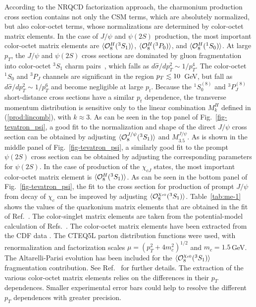According to the NRQCD factorization approach, the charmonium
production cross section contains not only the CSM terms, which are
absolutely normalized, but also color-octet terms, whose
normalizations are determined by color-octet matrix elements.  In the
case of $J/\psi$ and $\psi(2S)$ production, the most important
color-octet matrix elements are $\langle{\cal O}^H_8({}^3S_1)\rangle$,
$\langle{\cal O}^H_8({}^3P_0)\rangle$, and $\langle{\cal
O}^H_8({}^1S_0)\rangle$. At large $p_T$, the $J/\psi$ and $\psi(2S)$
cross sections are dominated by gluon fragmentation into color-octet
${}^3S_1$ charm pairs~\cite{Braaten:1995vv}, which falls as
$d\hat{\sigma}/dp_T^2\sim1/p_T^4$. The color-octet ${}^1S_0$ and
${}^3P_J$ channels are significant in the region $p_T\; \rlap{\lower
3.5 pt \hbox{$\mathchar \sim$}} \raise 1pt \hbox {$<$}\; 10$~GeV, but
fall as $d\hat{\sigma}/dp_T^2\sim1/p_T^6$ and become negligible at
large $p_t$.  Because the ${}^1S_0^{(8)}$ and ${}^3P_J^{(8)}$
short-distance cross sections have a similar $p_t$ dependence, the
transverse momentum distribution is sensitive only to the linear
combination $M^H_k$ defined in (\ref{prod:lincomb}), with $k\approx
3$.  As can be seen in the top panel of Fig.~\ref{fig-tevatron_psi}, a
good fit to the normalization and shape of the direct $J/\psi$ cross
section can be obtained by adjusting $\langle{\cal
O}^{J/\psi}_8({}^3S_1)\rangle$ and $M^{J/\psi}_{3.5}$. As is shown in
the middle panel of Fig.~\ref{fig-tevatron_psi}, a similarly good fit
to the prompt $\psi(2S)$ cross section can be obtained by adjusting
the corresponding parameters for $\psi(2S)$.  In the case of
production of the $\chi_{cJ}$ states, the most important color-octet
matrix element is $\langle{\cal O}^H_8({}^3S_1)\rangle$.  As can be
seen in the bottom panel of Fig.~\ref{fig-tevatron_psi}, the fit to
the cross section for production of prompt $J/\psi$ from decay of
$\chi_c$ can be improved by adjusting $\langle{\cal
O}^{\chi_{c0}}_8({}^3S_1)\rangle$.  Table~\ref{tab:me-1} shows the
values of the quarkonium matrix elements that are obtained in the fit
of Ref.~\cite{Kramer:2001hh,Beneke:1996yw}.  The color-singlet matrix
elements are taken from the potential-model calculation of
Refs.~\cite{Buchmuller:1980su,Eichten:1995ch}.  The color-octet matrix
elements have been extracted from the CDF data
\cite{Abe:1997jz,Abe:1997yz}.  The CTEQ5L parton distribution
functions \cite{Lai:1999wy} were used, with renormalization and
factorization scales $\mu=(p_T^2+4 m_c^2)^{1/2}$ and
$m_c=1.5\,$GeV. The Altarelli-Parisi evolution has been included for
the $\langle{\cal O}^{\chi_{c0}}_8({}^3S_1)\rangle$ fragmentation
contribution. See Ref.~\cite{Beneke:1996yw} for further details. The
extraction of the various color-octet matrix elements relies on the
differences in their $p_T$ dependences. Smaller experimental error
bars could help to resolve the different $p_T$ dependences with
greater precision.

